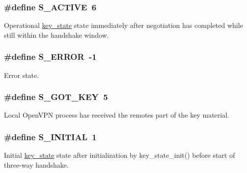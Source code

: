 \subsubsection[{S\+\_\+\+A\+C\+T\+I\+V\+E}]{\setlength{\rightskip}{0pt plus 5cm}\#define S\+\_\+\+A\+C\+T\+I\+V\+E~6}\label{group__control__processor_ga0b9dd6c70b47159cdbfbeecb4b971197}
Operational {\ttfamily \hyperlink{structkey__state}{key\+\_\+state}} state immediately after negotiation has completed while still within the handshake window. \hypertarget{group__control__processor_gaf6e8cab5d0642b96ef462156816c3a28}{}
\subsubsection[{S\+\_\+\+E\+R\+R\+O\+R}]{\setlength{\rightskip}{0pt plus 5cm}\#define S\+\_\+\+E\+R\+R\+O\+R~-\/1}\label{group__control__processor_gaf6e8cab5d0642b96ef462156816c3a28}
Error state. \hypertarget{group__control__processor_ga66bd0f7cdbc8450a4690c519de7d75bc}{}
\subsubsection[{S\+\_\+\+G\+O\+T\+\_\+\+K\+E\+Y}]{\setlength{\rightskip}{0pt plus 5cm}\#define S\+\_\+\+G\+O\+T\+\_\+\+K\+E\+Y~5}\label{group__control__processor_ga66bd0f7cdbc8450a4690c519de7d75bc}
Local Open\+V\+P\+N process has received the remote\textquotesingle{}s part of the key material. \hypertarget{group__control__processor_gaf80d9f1dca21e561e35220bdeee2fc1e}{}
\subsubsection[{S\+\_\+\+I\+N\+I\+T\+I\+A\+L}]{\setlength{\rightskip}{0pt plus 5cm}\#define S\+\_\+\+I\+N\+I\+T\+I\+A\+L~1}\label{group__control__processor_gaf80d9f1dca21e561e35220bdeee2fc1e}
Initial {\ttfamily \hyperlink{structkey__state}{key\+\_\+state}} state after initialization by {\ttfamily key\+\_\+state\+\_\+init()} before start of three-\/way handshake. \hypertarget{group__control__processor_gaa92fb79464b68ac009946bd9cc9b8d89}{}

